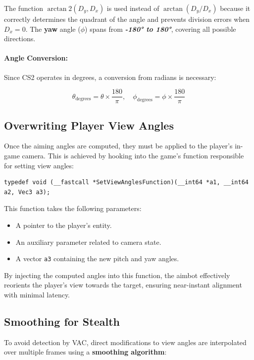 The function \(\arctan2(D_y, D_x)\) is used instead of \(\arctan(D_y / D_x)\) because it correctly determines the quadrant of the angle and prevents division errors when \( D_x = 0 \). The \textbf{yaw} angle (\(\phi\)) spans from \textit{\textbf{-180° to 180°}}, covering all possible directions.

\paragraph{\textbf{Angle Conversion:}}  
Since CS2 operates in degrees, a conversion from radians is necessary:

\[
\theta_{\text{degrees}} = \theta \times \frac{180}{\pi}, \quad
\phi_{\text{degrees}} = \phi \times \frac{180}{\pi}
\]



\subsection{Overwriting Player View Angles}

Once the aiming angles are computed, they must be applied to the player’s in-game camera. This is achieved by hooking into the game’s function responsible for setting view angles:

\begin{lstlisting}[style=cppstyle, caption={Overwriting Player View Angles}]
typedef void (__fastcall *SetViewAnglesFunction)(__int64 *a1, __int64 a2, Vec3 a3);
\end{lstlisting}

This function takes the following parameters:
\begin{itemize}
    \item A pointer to the player’s entity.
    \item An auxiliary parameter related to camera state.
    \item A vector \texttt{a3} containing the new pitch and yaw angles.
\end{itemize}

By injecting the computed angles into this function, the aimbot effectively reorients the player's view towards the target, ensuring near-instant alignment with minimal latency.

\subsection{Smoothing for Stealth}

To avoid detection by VAC, direct modifications to view angles are interpolated over multiple frames using a \textbf{smoothing algorithm}:

